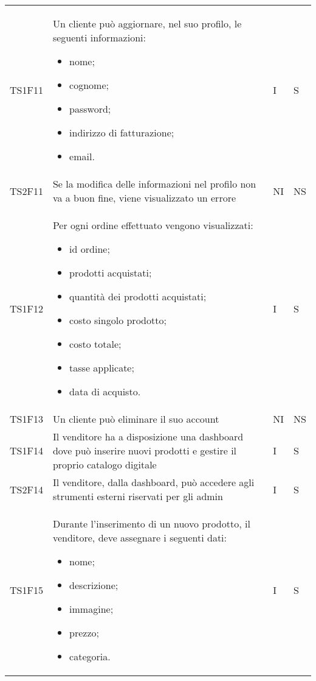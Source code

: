 {\begin{longtable}{C{2cm} C{9.6cm} C{1.5cm} C{1cm}}
TS1F11 & Un cliente può aggiornare, nel suo profilo, le seguenti informazioni:
\begin{itemize}
	\item nome;
	\item cognome;
	\item password;
	\item indirizzo di fatturazione;
	\item email.
\end{itemize}
& I & S\\

TS2F11 & Se la modifica delle informazioni nel profilo non va a buon fine, viene visualizzato un errore & NI & NS\\

TS1F12 & Per ogni ordine effettuato vengono visualizzati:
\begin{itemize}
	\item id ordine;
	\item prodotti acquistati;
	\item quantità dei prodotti acquistati;
	\item costo singolo prodotto;
	\item costo totale;
	\item tasse applicate;
	\item data di acquisto.
\end{itemize}
& I & S\\

TS1F13 & Un cliente può eliminare il suo account & NI & NS\\

TS1F14 & Il venditore ha a disposizione una dashboard dove può inserire nuovi prodotti e gestire il proprio catalogo digitale & I & S\\

TS2F14 & Il venditore, dalla dashboard, può accedere agli strumenti esterni riservati per gli admin & I & S\\

TS1F15 & Durante l'inserimento di un nuovo prodotto, il venditore, deve assegnare i seguenti dati:
\begin{itemize}
	\item nome;
	\item descrizione;
	\item immagine;
	\item prezzo;
	\item categoria.
\end{itemize} & I & S\\


\end{longtable}}
